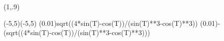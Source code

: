 \documentclass[a4j,fleqn]{jarticle}
\begin{document}
\begin{showEx}(1,.9){}
\begin{zahyou}[ul=10mm](-5,5)(-5,5)
\def\emLlim{0.0001}
\xi
\def\Ft{sqrt((4*sin(T)-cos(T))/(sin(T)**3-cos(T)**3))}
\RGurafu*[hazimet=$pi/4,owarit=$pi+\xi](0.01)\Ft
\RGurafu*[hazimet=$pi/4,owarit=$pi+\xi](0.01){-(\Ft)}
\Takakkei{\LT\LB\RB\RT}
\Hasen{(\xmin,\xmin)(\xmax,\xmax)}
\end{zahyou}%
\end{showEx}
\end{document}
